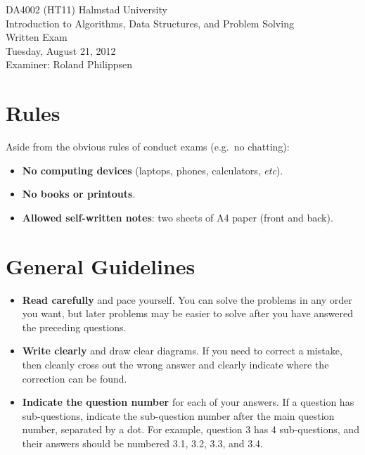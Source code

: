 \documentclass[a4paper]{article}
\newcounter{question}
\begin{document}
\pagestyle{empty}
\thispagestyle{empty}



\noindent
\begin{minipage}{\columnwidth}
  \centering
  \Large
  DA4002 (HT11) Halmstad University\\
  Introduction to Algorithms, Data Structures, and Problem Solving\\[3\baselineskip]
  \Huge
  Written Exam\\
  \Large
  Tuesday, August 21, 2012\\[2\baselineskip]
  Examiner: Roland Philippsen
\end{minipage}

\vfill

\noindent
\begin{center}
\end{center}

\vfill



\section*{Rules}

Aside from the obvious rules of conduct exams (e.g.\ no chatting):

\begin{itemize}
\item
  \textbf{No computing devices} (laptops, phones, calculators, \emph{etc}).
\item
  \textbf{No books or printouts}.
\item
  \textbf{Allowed self-written notes}: two sheets of A4 paper (front and back).
\end{itemize}



\section*{General Guidelines}

\begin{itemize}
\item
  \textbf{Read carefully} and pace yourself.
  You can solve the problems in any order you want, but later problems may be easier to solve after you have answered the preceding questions.
\item
  \textbf{Write clearly} and draw clear diagrams.
  If you need to correct a mistake, then cleanly cross out the wrong answer and clearly indicate where the correction can be found.
\item
  \textbf{Indicate the question number} for each of your answers.
  If a question has sub-questions, indicate the sub-question number after the main question number, separated by a dot.
  For example, question 3 has 4 sub-questions, and their answers should be numbered 3.1, 3.2, 3.3, and 3.4.
\end{itemize}
\end{document}

